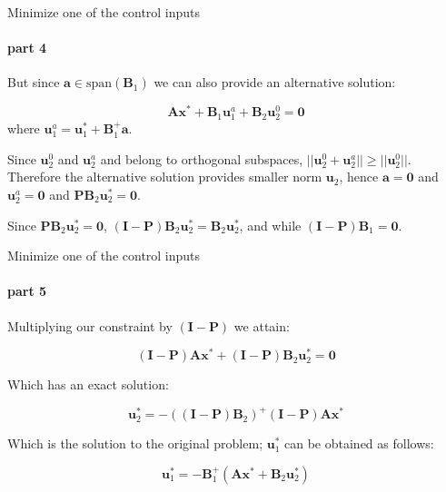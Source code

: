 \documentclass{beamer}
\begin{document}
\begin{frame}{Minimize one of the control inputs}
\framesubtitle{part 4}
\begin{flushleft}

But since $\mathbf{a} \in \text{span}(\mathbf{B}_1)$ we can also provide an alternative solution:

\begin{equation}
    \mathbf{A} \mathbf{x}^* + \mathbf{B}_1 \mathbf{u}^a_1 + \mathbf{B}_2 \mathbf{u}^0_2 = \mathbf{0}
\end{equation}
%
where $\mathbf{u}^a_1 = \mathbf{u}^*_1 + \mathbf{B}^+_1 \mathbf{a}$.

\bigskip

Since $\mathbf{u}^0_2$ and $\mathbf{u}^a_2$ and belong to orthogonal subspaces, $||\mathbf{u}^0_2 + \mathbf{u}^a_2|| \geq ||\mathbf{u}^0_2||$. Therefore the alternative solution provides smaller norm $\mathbf{u}_2$, hence $\mathbf{a} = \mathbf{0}$ and $\mathbf{u}^a_2 = \mathbf{0}$ and $\mathbf{P} \mathbf{B}_2 \mathbf{u}^*_2 = \mathbf{0}$.

\bigskip

Since $\mathbf{P} \mathbf{B}_2 \mathbf{u}^*_2 = \mathbf{0}$, $(\mathbf{I} - \mathbf{P}) \mathbf{B}_2 \mathbf{u}^*_2 = \mathbf{B}_2\mathbf{u}^*_2$, and while $(\mathbf{I} - \mathbf{P}) \mathbf{B}_1 = \mathbf{0}$.


\end{flushleft}
\end{frame}




\begin{frame}{Minimize one of the control inputs}
\framesubtitle{part 5}
\begin{flushleft}

 Multiplying our constraint by $(\mathbf{I} - \mathbf{P})$ we attain:

\begin{equation}
    (\mathbf{I} - \mathbf{P}) \mathbf{A} \mathbf{x}^* + (\mathbf{I} - \mathbf{P}) \mathbf{B}_2 \mathbf{u}^*_2 = \mathbf{0}
\end{equation}

Which has an exact solution:

\begin{equation}
\label{Solution_u2}
     \mathbf{u}^*_2 = -((\mathbf{I} - \mathbf{P}) \mathbf{B}_2)^+(\mathbf{I} - \mathbf{P}) \mathbf{A} \mathbf{x}^*
\end{equation}

Which is the solution to the original problem; $\mathbf{u}^*_1$ can be obtained as follows:

\begin{equation}
\label{Solution_u1}
      \mathbf{u}^*_1  = -\mathbf{B}^+_1(\mathbf{A} \mathbf{x}^* + \mathbf{B}_2 \mathbf{u}^*_2)
\end{equation}


\end{flushleft}
\end{frame}
\end{document}
